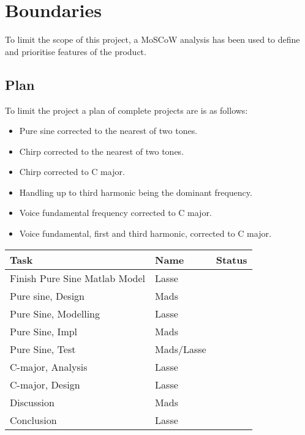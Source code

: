 
\chapter{Boundaries}
\label{sec:Boundaries}
To limit the scope of this project, a MoSCoW analysis has been used to define and prioritise features of the product.

\section{Plan}
To limit the project a plan of complete projects are is as follows:

\begin{itemize}
	\item Pure sine corrected to the nearest of two tones.
	\item Chirp corrected to the nearest of two tones.
	\item Chirp corrected to C major.
	\item Handling up to third harmonic being the dominant frequency.
	\item Voice fundamental frequency corrected to C major.
	\item Voice fundamental, first and third harmonic, corrected to C major.
\end{itemize}

\begin{table}
	\centering
	\begin{tabular}{l l l}
		\toprule
		Task & Name & Status \\
		\midrule
		Finish Pure Sine Matlab Model & Lasse & \\
		Pure sine, Design & Mads & \\
		Pure Sine, Modelling & Lasse & \\
		Pure Sine, Impl & Mads & \\
		Pure Sine, Test & Mads/Lasse & \\
		C-major, Analysis & Lasse & \\
		C-major, Design & Lasse & \\
		Discussion & Mads & \\
		Conclusion & Lasse & \\
		\bottomrule
	\end{tabular}
\end{table}
